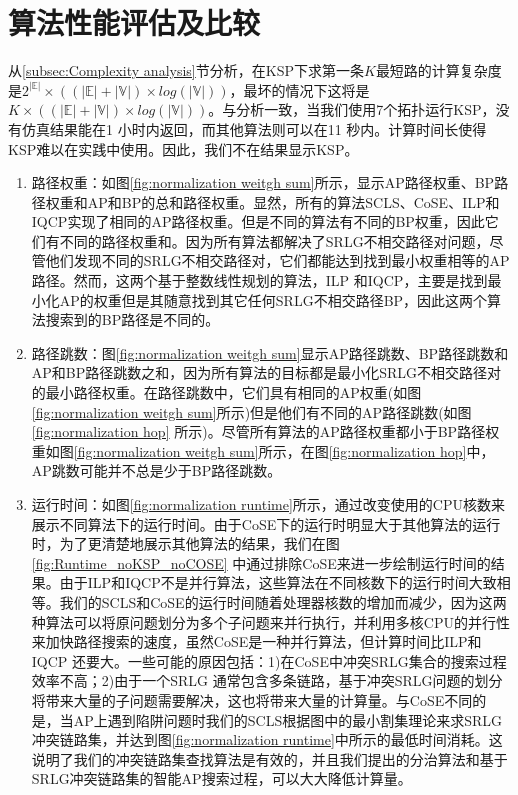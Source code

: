 \section{算法性能评估及比较}
从\ref{subsec:Complexity analysis}节分析，在KSP下求第一条$K$最短路的计算复杂度是$2^{|\mathbb{E}|}\times ((|\mathbb{E}|+|\mathbb{V}|)\times log(|\mathbb{V}|))$，最坏的情况下这将是$K\times ((|\mathbb{E}|+|\mathbb{V}|)\times log(|\mathbb{V}|))$。与分析一致，当我们使用7个拓扑运行KSP，没有仿真结果能在1 小时内返回，而其他算法则可以在11 秒内。计算时间长使得KSP难以在实践中使用。因此，我们不在结果显示KSP。
\begin{enumerate}
  \item 路径权重：如图\ref{fig:normalization weitgh sum}所示，显示AP路径权重、BP路径权重和AP和BP的总和路径权重。显然，所有的算法SCLS、CoSE、ILP和IQCP实现了相同的AP路径权重。但是不同的算法有不同的BP权重，因此它们有不同的路径权重和。因为所有算法都解决了SRLG不相交路径对问题，尽管他们发现不同的SRLG不相交路径对，它们都能达到找到最小权重相等的AP路径。然而，这两个基于整数线性规划的算法，ILP 和IQCP，主要是找到最小化AP的权重但是其随意找到其它任何SRLG不相交路径BP，因此这两个算法搜索到的BP路径是不同的。
  \item 路径跳数：图\ref{fig:normalization weitgh sum}显示AP路径跳数、BP路径跳数和AP和BP路径跳数之和，因为所有算法的目标都是最小化SRLG不相交路径对的最小路径权重。在路径跳数中，它们具有相同的AP权重(如图\ref{fig:normalization weitgh sum}所示)但是他们有不同的AP路径跳数(如图\ref{fig:normalization hop} 所示)。尽管所有算法的AP路径权重都小于BP路径权重如图\ref{fig:normalization weitgh sum}所示，在图\ref{fig:normalization hop}中，AP跳数可能并不总是少于BP路径跳数。
  \item 运行时间：如图\ref{fig:normalization runtime}所示，通过改变使用的CPU核数来展示不同算法下的运行时间。由于CoSE下的运行时明显大于其他算法的运行时，为了更清楚地展示其他算法的结果，我们在图\ref{fig:Runtime_noKSP_noCOSE} 中通过排除CoSE来进一步绘制运行时间的结果。由于ILP和IQCP不是并行算法，这些算法在不同核数下的运行时间大致相等。我们的SCLS和CoSE的运行时间随着处理器核数的增加而减少，因为这两种算法可以将原问题划分为多个子问题来并行执行，并利用多核CPU的并行性来加快路径搜索的速度，虽然CoSE是一种并行算法，但计算时间比ILP和IQCP 还要大。一些可能的原因包括：1)在CoSE中冲突SRLG集合的搜索过程效率不高；2)由于一个SRLG 通常包含多条链路，基于冲突SRLG问题的划分将带来大量的子问题需要解决，这也将带来大量的计算量。与CoSE不同的是，当AP上遇到陷阱问题时我们的SCLS根据图中的最小割集理论来求SRLG冲突链路集，并达到图\ref{fig:normalization runtime}中所示的最低时间消耗。这说明了我们的冲突链路集查找算法是有效的，并且我们提出的分治算法和基于SRLG冲突链路集的智能AP搜索过程，可以大大降低计算量。

\end{enumerate}
